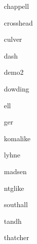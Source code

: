 \begin{demochap}{chappell}\end{demochap}

\begin{demochap}[-2\onelineskip]{crosshead}\end{demochap}

\begin{demochap}[-\onelineskip]{culver}\end{demochap}

\begin{demochap}[-4\onelineskip]{dash}\end{demochap}

\begin{demochap}[-\onelineskip]{demo2}\end{demochap}

\begin{demochap}[-2\onelineskip]{dowding}\end{demochap}

\begin{demochap}{ell}\end{demochap}

\begin{demochap}[-4\onelineskip]{ger}\end{demochap}

\begin{demochap}[-2\onelineskip]{komalike}\end{demochap}

\begin{demochap*}[-2\onelineskip]{lyhne}\end{demochap*}

\clearpage

\begin{demochap*}[-2\onelineskip]{madsen}\end{demochap*}

\begin{demochap}[-3\onelineskip]{ntglike}\end{demochap}

\begin{demochap}[-\onelineskip]{southall}\end{demochap}

\begin{demochap}[-1\onelineskip]{tandh}\end{demochap}

\begin{demochap}{thatcher}\end{demochap}

